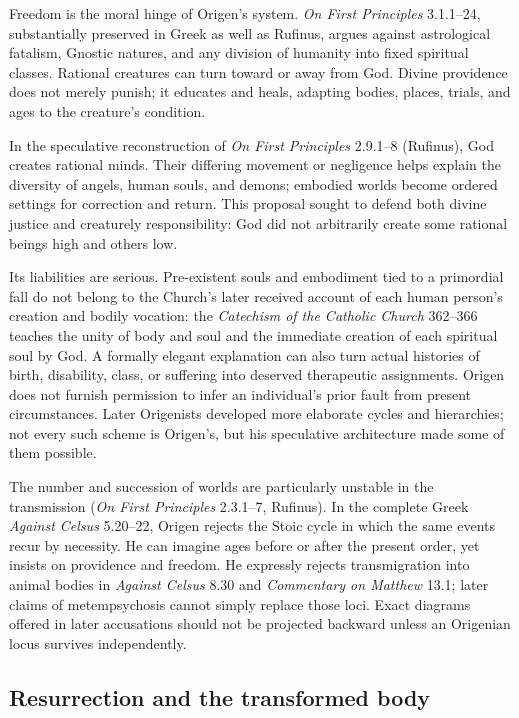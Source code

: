 Freedom is the moral hinge of Origen's system. \emph{On First Principles}
3.1.1--24, substantially preserved in Greek as well as Rufinus, argues against
astrological fatalism,
Gnostic natures, and any division of humanity into fixed spiritual classes.
Rational creatures can turn toward or away from God. Divine
providence does not merely punish; it educates and heals, adapting bodies,
places, trials, and ages to the creature's condition.

In the speculative reconstruction of \emph{On First Principles} 2.9.1--8
(Rufinus), God creates rational minds. Their differing movement or
negligence helps explain the diversity of angels, human souls, and demons;
embodied worlds become ordered settings for correction and return. This
proposal sought to defend both divine justice and creaturely responsibility:
God did not arbitrarily create some rational beings high and others low.

Its liabilities are serious. Pre-existent souls and embodiment tied to a
primordial fall do not belong to the Church's later received account of each
human person's creation and bodily vocation: the \emph{Catechism of the
Catholic Church} 362--366 teaches the unity of body and soul and the immediate
creation of each spiritual soul by God. A formally elegant explanation
can also turn actual histories of birth, disability, class, or suffering into
deserved therapeutic assignments. Origen does not furnish permission to infer
an individual's prior fault from present circumstances. Later Origenists
developed more elaborate cycles and hierarchies; not every such scheme is
Origen's, but his speculative architecture made some of them possible.

The number and succession of worlds are particularly unstable in the
transmission (\emph{On First Principles} 2.3.1--7, Rufinus). In the complete
Greek \emph{Against Celsus} 5.20--22, Origen rejects the Stoic cycle in which the same events recur by
necessity. He can imagine ages before or after the present order, yet insists
on providence and freedom. He expressly rejects transmigration into animal
bodies in \emph{Against Celsus} 8.30 and \emph{Commentary on Matthew} 13.1;
later claims of metempsychosis cannot simply replace those loci. Exact diagrams
offered in later accusations should not be projected backward unless an
Origenian locus survives independently.

\subsection{Resurrection and the transformed body}

